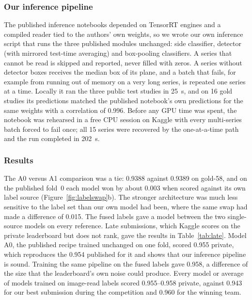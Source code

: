 \subsubsection{Our inference pipeline} The published inference notebooks depended on TensorRT engines and a compiled reader tied to the authors' own weights, so we wrote our own inference script that runs the three published modules unchanged: side classifier, detector (with mirrored test-time averaging) and box-pooling classifiers. A series that cannot be read is skipped and reported, never filled with zeros. A series without detector boxes receives the median box of its plane, and a batch that fails, for example from running out of memory on a very long series, is repeated one series at a time. Locally it ran the three public test studies in 25~s, and on 16 gold studies its predictions matched the published notebook's own predictions for the same weights with a correlation of 0.996. Before any GPU time was spent, the notebook was rehearsed in a free CPU session on Kaggle with every multi-series batch forced to fail once; all 15 series were recovered by the one-at-a-time path and the run completed in 202~s.

\subsubsection{Results} The A0 versus A1 comparison was a tie: 0.9388 against 0.9389 on gold-58, and on the published fold~0 each model won by about 0.003 when scored against its own label source (Figure~\ref{fig:labelswap}b). The stronger architecture was much less sensitive to the label set than our own model had been, where the same swap had made a difference of 0.015. The fused labels gave a model between the two single-source models on every reference. Late submissions, which Kaggle scores on the private leaderboard but does not rank, gave the results in Table~\ref{tab:late}. Model A0, the published recipe trained unchanged on one fold, scored 0.955 private, which reproduces the 0.954 published for it and shows that our inference pipeline is sound. Training the same pipeline on the fused labels gave 0.958, a difference of the size that the leaderboard's own noise could produce. Every model or average of models trained on image-read labels scored 0.955--0.958 private, against 0.943 for our best submission during the competition and 0.960 for the winning team.

